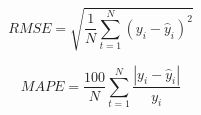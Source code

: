 \documentclass[format=sigconf, review=false, screen=true]{acmart}
\begin{document}
\begin{equation}
\label{eq:rmse}
	 RMSE = \sqrt{\frac{1}{N} \sum_{t=1}^{N} (y_i-\hat{y}_i)^2}
\end{equation}

\begin{equation} 
\label{eq:mape}
	MAPE = \frac{100}{N} \sum_{t=1}^{N} \frac{|y_i-\hat{y}_i|}{y_i}
\end{equation}




%
%
%
%
%
%
%
\end{document}
